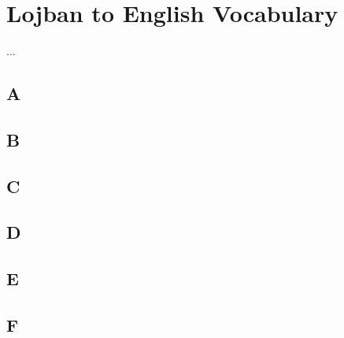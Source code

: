\documentclass[12pt]{book}
\begin{document}
\section{Lojban to English Vocabulary}

...

\subsection{A} %

\begin{description}
\item[ ]
\end{description}

\subsection{B} %

\begin{description}
\item[ ]
\end{description}

\subsection{C} %

\begin{description}
\item[ ]
\end{description}

\subsection{D} %

\begin{description}
\item[ ]
\end{description}

\subsection{E} %

\begin{description}
\item[ ]
\end{description}

\subsection{F} %
\end{document}
